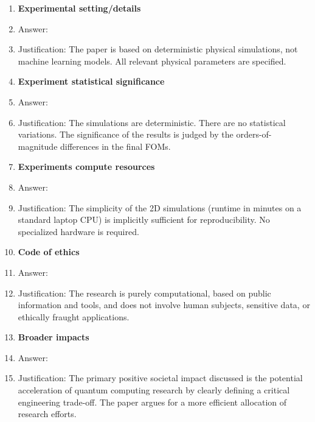 \documentclass{article}
\begin{document}
\begin{enumerate}
\item {\bf Experimental setting/details}
    \item[] Answer: \answerNA{}
    \item[] Justification: The paper is based on deterministic physical simulations, not machine learning models. All relevant physical parameters are specified.

\item {\bf Experiment statistical significance}
    \item[] Answer: \answerNA{}
    \item[] Justification: The simulations are deterministic. There are no statistical variations. The significance of the results is judged by the orders-of-magnitude differences in the final FOMs.

\item {\bf Experiments compute resources}
    \item[] Answer: \answerYes{}
    \item[] Justification: The simplicity of the 2D simulations (runtime in minutes on a standard laptop CPU) is implicitly sufficient for reproducibility. No specialized hardware is required.

\item {\bf Code of ethics}
    \item[] Answer: \answerYes{}
    \item[] Justification: The research is purely computational, based on public information and tools, and does not involve human subjects, sensitive data, or ethically fraught applications.

\item {\bf Broader impacts}
    \item[] Answer: \answerYes{}
    \item[] Justification: The primary positive societal impact discussed is the potential acceleration of quantum computing research by clearly defining a critical engineering trade-off. The paper argues for a more efficient allocation of research efforts.
\end{enumerate}
\end{document}
